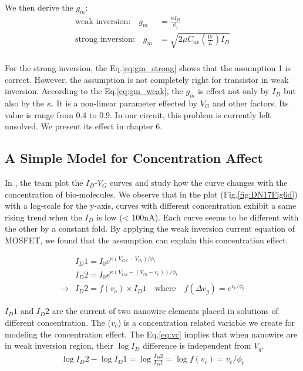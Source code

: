 We then derive the $g_m$:
\begin{align}
    \text{weak inversion:} \quad g_m & = \frac{\kappa I_D}{\phi_t}\\ \label{eq:gm_weak}
    \text{strong inversion:} \quad g_m & = \sqrt{2 \mu C_{ox} (\frac{W}{L})I_{D}} \\ \label{eq:gm_strong}
\end{align}

For the strong inversion, the Eq.\ref{eq:gm_strong} shows that the assumption 1 is correct.
However, the assumption is not completely right for transistor in weak inversion.
According to the Eq.\ref{eq:gm_weak}, the $g_m$ is effect not only by $I_D$ but also by the $\kappa$.
It is a non-linear parameter effected by $V_G$ and other factors.
Its value is range from 0.4 to 0.9.
In our circuit, this problem is currently left unsolved.
We present its effect in chapter 6.


\subsection{A Simple Model for Concentration Affect}
In \cite{DN17}, the team plot the $I_D$-$V_G$ curves and study how the curve changes with the concentration of bio-molecules.
We observe that in the plot (Fig.\ref{fig:DN17Fig6d}) with a log-scale for the y-axis, curves with different concentration exhibit a same rising trend when the $I_D$ is low (< 100nA).
Each curve seems to be different with the other by a constant fold.
By applying the weak inversion current equation of MOSFET, we found that the assumption can explain this concentration effect.

\begin{align}
    & I_D1 = I_{0} e^{\kappa(V_{GS} - V_{th}) / \phi_t} \\
    & I_D2 = I_{0} e^{\kappa(V_{GS} - (V_{th} - v_c)) / \phi_t} \\
    \rightarrow & I_D2 = f(v_c) \times I_D1 \quad \text{where} \quad f(\Delta v_g) = e^{v_c / \phi_t} \label{eq:vc}
\end{align}

$I_D1$ and $I_D2$ are the current of two nanowire elements placed in solutions of different concentration.
The ($v_c$) is a concentration related variable we create for modeling the concentration effect.
The Eq.\ref{eq:vc} implies that when nanowire are in weak inversion region, their $\log I_D$ difference is independent from $V_g$.
\begin{align}
    \log I_D2 - \log I_D1 = \log \frac{I_D2}{I_D1} = \log f(v_c) = v_c / \phi_t
\end{align}

